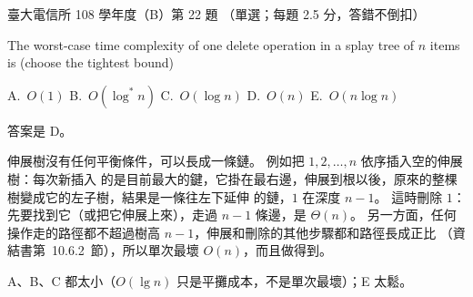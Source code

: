 \begin{pastexam}[label={px:ntu-108-comm-dsab-22}]{臺大電信所 108 學年度（B）第 22 題}
（單選；每題 2.5 分，答錯不倒扣）

The worst-case time complexity of one delete operation in a splay tree of $n$ items is (choose
the tightest bound)

A.~$O(1)$ \qquad B.~$O(\log^* n)$ \qquad C.~$O(\log n)$ \qquad D.~$O(n)$ \qquad E.~$O(n\log n)$
\end{pastexam}

\begin{pastsoln}
答案是 D。

伸展樹沒有任何平衡條件，可以長成一條鏈。 例如把 $1, 2, \ldots, n$ 依序插入空的伸展樹：每次新插入
的是目前最大的鍵，它掛在最右邊，伸展到根以後，原來的整棵樹變成它的左子樹，結果是一條往左下延伸
的鏈，$1$ 在深度 $n - 1$。 這時刪除 $1$：先要找到它（或把它伸展上來），走過 $n - 1$ 條邊，是
$\Theta(n)$。 另一方面，任何操作走的路徑都不超過樹高 $n - 1$，伸展和刪除的其他步驟都和路徑長成正比
（資結書第~10.6.2~節），所以單次最壞 $O(n)$，而且做得到。

A、B、C 都太小（$O(\lg n)$ 只是平攤成本，不是單次最壞）；E 太鬆。
\end{pastsoln}
